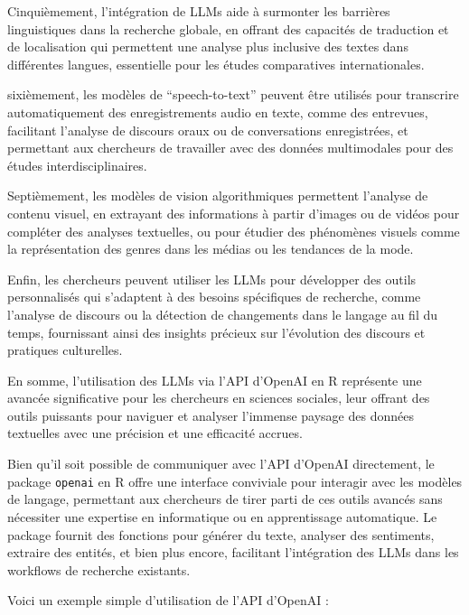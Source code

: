 \documentclass[
  letterpaper,
  DIV=11,
  numbers=noendperiod]{scrreprt}
\begin{document}
Cinquièmement, l'intégration de LLMs aide à surmonter les barrières
linguistiques dans la recherche globale, en offrant des capacités de
traduction et de localisation qui permettent une analyse plus inclusive
des textes dans différentes langues, essentielle pour les études
comparatives internationales.

sixièmement, les modèles de ``speech-to-text'' peuvent être utilisés
pour transcrire automatiquement des enregistrements audio en texte,
comme des entrevues, facilitant l'analyse de discours oraux ou de
conversations enregistrées, et permettant aux chercheurs de travailler
avec des données multimodales pour des études interdisciplinaires.

Septièmement, les modèles de vision algorithmiques permettent l'analyse
de contenu visuel, en extrayant des informations à partir d'images ou de
vidéos pour compléter des analyses textuelles, ou pour étudier des
phénomènes visuels comme la représentation des genres dans les médias ou
les tendances de la mode.

Enfin, les chercheurs peuvent utiliser les LLMs pour développer des
outils personnalisés qui s'adaptent à des besoins spécifiques de
recherche, comme l'analyse de discours ou la détection de changements
dans le langage au fil du temps, fournissant ainsi des insights précieux
sur l'évolution des discours et pratiques culturelles.

En somme, l'utilisation des LLMs via l'API d'OpenAI en R représente une
avancée significative pour les chercheurs en sciences sociales, leur
offrant des outils puissants pour naviguer et analyser l'immense paysage
des données textuelles avec une précision et une efficacité accrues.

Bien qu'il soit possible de communiquer avec l'API d'OpenAI directement,
le package \texttt{openai} en R offre une interface conviviale pour
interagir avec les modèles de langage, permettant aux chercheurs de
tirer parti de ces outils avancés sans nécessiter une expertise en
informatique ou en apprentissage automatique. Le package fournit des
fonctions pour générer du texte, analyser des sentiments, extraire des
entités, et bien plus encore, facilitant l'intégration des LLMs dans les
workflows de recherche existants.

Voici un exemple simple d'utilisation de l'API d'OpenAI :
\end{document}
